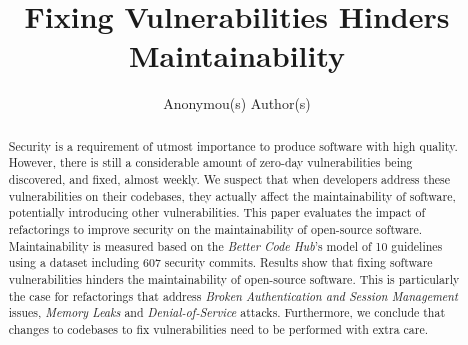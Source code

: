 \documentclass[10pt,conference]{IEEEtran}
\begin{document}
\title{Fixing Vulnerabilities Hinders Maintainability}

\author{
    Anonymou(s) Author(s)
	
}

\maketitle

\begin{abstract}
Security is a requirement of utmost importance to produce software with high
quality. However, there is still a considerable amount of zero-day
vulnerabilities being discovered, and fixed, almost weekly. We suspect that when
developers address these vulnerabilities on their codebases, they actually
affect the maintainability of software, potentially introducing other
vulnerabilities. This paper evaluates the impact of refactorings to improve
security on the maintainability of open-source software. Maintainability is
measured based on the \emph{Better Code Hub}'s model of 10 guidelines using a
dataset including $607$ security commits. Results show that fixing software
vulnerabilities hinders the maintainability of open-source software. This is
particularly the case for refactorings that address \emph{Broken Authentication
and Session Management} issues, \emph{Memory Leaks} and \emph{Denial-of-Service}
attacks. Furthermore, we conclude that changes to codebases to fix vulnerabilities
need to be performed with extra care.
\end{abstract}
\end{document}
